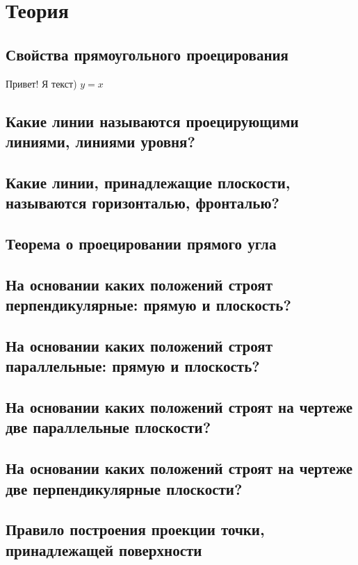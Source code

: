 


\setmainfont{GOST type B} 
\section{Теория}
\subsection{Свойства прямоугольного проецирования}

Привет! Я текст)
$y = x$

\subsection{Какие линии называются проецирующими линиями, линиями уровня?}
\subsection{Какие линии, принадлежащие плоскости, называются горизонталью, фронталью?}
\subsection{Теорема о проецировании прямого угла}
\subsection{На основании каких положений строят перпендикулярные: прямую и плоскость?}
\subsection{На основании каких положений строят параллельные: прямую и плоскость?}
\subsection{На основании каких положений строят на чертеже две параллельные плоскости?}
\subsection{На основании каких положений строят на чертеже две перпендикулярные плоскости?}
\subsection{Правило построения проекции точки, принадлежащей поверхности}
